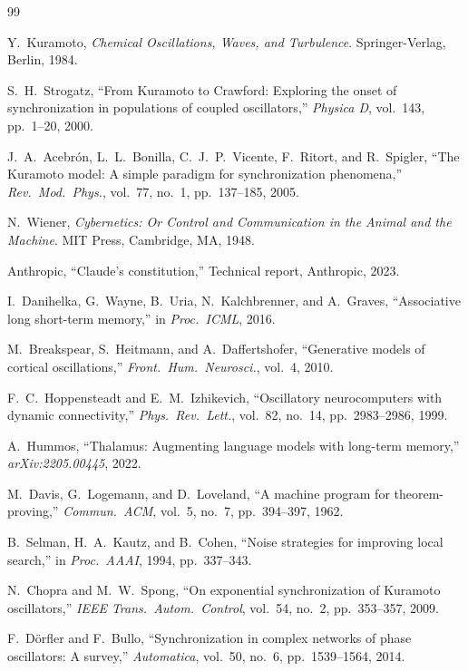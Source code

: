 \documentclass[12pt]{article}
\begin{document}
\begin{thebibliography}{99}

Y.~Kuramoto,
\textit{Chemical Oscillations, Waves, and Turbulence}.
Springer-Verlag, Berlin, 1984.

S.~H.\ Strogatz,
``From Kuramoto to Crawford: Exploring the onset of synchronization in
populations of coupled oscillators,''
\textit{Physica D}, vol.~143, pp.~1--20, 2000.

J.~A.\ Acebrón, L.~L.\ Bonilla, C.~J.\ P.\ Vicente, F.~Ritort, and
R.~Spigler,
``The Kuramoto model: A simple paradigm for synchronization phenomena,''
\textit{Rev.\ Mod.\ Phys.}, vol.~77, no.~1, pp.~137--185, 2005.

N.~Wiener,
\textit{Cybernetics: Or Control and Communication in the Animal and the Machine}.
MIT Press, Cambridge, MA, 1948.

Anthropic,
``Claude's constitution,''
Technical report, Anthropic, 2023.

I.~Danihelka, G.~Wayne, B.~Uria, N.~Kalchbrenner, and A.~Graves,
``Associative long short-term memory,''
in \textit{Proc.\ ICML}, 2016.

M.~Breakspear, S.~Heitmann, and A.~Daffertshofer,
``Generative models of cortical oscillations,''
\textit{Front.\ Hum.\ Neurosci.}, vol.~4, 2010.

F.~C.\ Hoppensteadt and E.~M.\ Izhikevich,
``Oscillatory neurocomputers with dynamic connectivity,''
\textit{Phys.\ Rev.\ Lett.}, vol.~82, no.~14, pp.~2983--2986, 1999.

A.~Hummos,
``Thalamus: Augmenting language models with long-term memory,''
\textit{arXiv:2205.00445}, 2022.

M.~Davis, G.~Logemann, and D.~Loveland,
``A machine program for theorem-proving,''
\textit{Commun.\ ACM}, vol.~5, no.~7, pp.~394--397, 1962.

B.~Selman, H.~A.\ Kautz, and B.~Cohen,
``Noise strategies for improving local search,''
in \textit{Proc.\ AAAI}, 1994, pp.~337--343.

N.~Chopra and M.~W.\ Spong,
``On exponential synchronization of Kuramoto oscillators,''
\textit{IEEE Trans.\ Autom.\ Control}, vol.~54, no.~2, pp.~353--357, 2009.

F.~D\"{o}rfler and F.~Bullo,
``Synchronization in complex networks of phase oscillators: A survey,''
\textit{Automatica}, vol.~50, no.~6, pp.~1539--1564, 2014.


\end{thebibliography}
\end{document}
